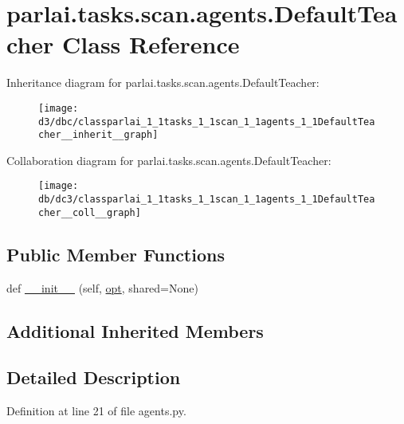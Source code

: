 \hypertarget{classparlai_1_1tasks_1_1scan_1_1agents_1_1DefaultTeacher}{}\section{parlai.\+tasks.\+scan.\+agents.\+Default\+Teacher Class Reference}
\label{classparlai_1_1tasks_1_1scan_1_1agents_1_1DefaultTeacher}


Inheritance diagram for parlai.\+tasks.\+scan.\+agents.\+Default\+Teacher\+:\nopagebreak
\begin{figure}[H]
\begin{center}
\leavevmode
\texttt{[image: d3/dbc/classparlai\_1\_1tasks\_1\_1scan\_1\_1agents\_1\_1DefaultTeacher\_\_inherit\_\_graph]}
\end{center}
\end{figure}


Collaboration diagram for parlai.\+tasks.\+scan.\+agents.\+Default\+Teacher\+:\nopagebreak
\begin{figure}[H]
\begin{center}
\leavevmode
\texttt{[image: db/dc3/classparlai\_1\_1tasks\_1\_1scan\_1\_1agents\_1\_1DefaultTeacher\_\_coll\_\_graph]}
\end{center}
\end{figure}
\subsection*{Public Member Functions}
\begin{DoxyCompactItemize}
\item 
def \hyperlink{classparlai_1_1tasks_1_1scan_1_1agents_1_1DefaultTeacher_a113f70356b142f1e9db8e80362287876}{\+\_\+\+\_\+init\+\_\+\+\_\+} (self, \hyperlink{classparlai_1_1core_1_1teachers_1_1FbDialogTeacher_af7a9ec497b9cd0292d7b8fa220da7c28}{opt}, shared=None)
\end{DoxyCompactItemize}
\subsection*{Additional Inherited Members}


\subsection{Detailed Description}


Definition at line 21 of file agents.\+py.



